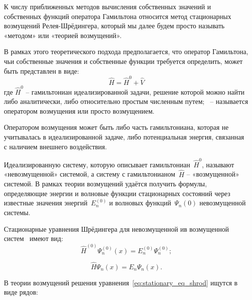 К числу приближенных методов вычисления собственных значений и собственных функций оператора Гамильтона относится метод стационарных возмущений Релея-Шрёдингера\cite{tim_pertrubations}, который мы далее будем просто называть «методом» или «теорией возмущений».


В рамках этого теоретического подхода предполагается, что оператор Гамильтона, чьи собственные значения и собственные функции требуется определить, может быть представлен в виде:
\begin{equation}
    \label{eq:gamilton_op}
    \hat{H} = \hat{H}^0 + \hat{V}
\end{equation}
где $\hat{H}^0$ -- гамильтониан идеализированной задачи, решение которой можно найти либо аналитически, либо относительно простым численным путем;~ -- называется оператором возмущения или просто возмущением.


Оператором возмущения может быть либо часть гамильтониана, которая не учитывалась в идеализированной задаче, либо потенциальная энергия, связанная с наличием внешнего воздействия.


Идеализированную систему, которую описывает гамильтониан~$\hat{H}^0$, называют «невозмущенной» системой, а систему с гамильтонианом~$\hat{H}$ -- «возмущенной» системой.
В рамках теории возмущений удаётся получить формулы, определяющие энергии и волновые функции стационарных состояний через известные значения энергий~$E_n^{(0)}$ и волновых функций~$\Psi_n{(0)}$ невозмущенной системы.


Стационарные уравнения Шрёдингера для невозмущенной ив возмущенной систем~\cite{tim_pertrubations} имеют вид:
\begin{equation}
\label{eq:stationary_eq_shrod0}
\hat{H}^{(0)}\Psi_n^{(0)}(x)=E_n^{(0)}\Psi_n^{(0)};
\end{equation}

\begin{equation}
\label{eq:stationary_eq_shrod}
\hat{H}\Psi_n(x)=E_n\Psi_n(x).
\end{equation}


В теории возмущений решения уравнения~\eqref{eq:stationary_eq_shrod} ищутся в виде рядов:


